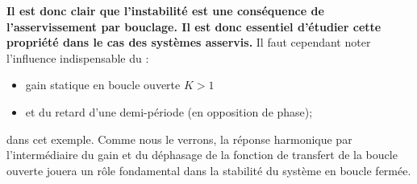 \textbf{Il est donc clair que l'instabilité est une conséquence de 
l'asservissement par bouclage. Il est donc essentiel d'étudier 
cette propriété dans le cas des systèmes asservis.}
Il faut cependant noter l'influence indispensable du :
\begin{itemize}
    \item gain statique en boucle ouverte $K>1$
    \item et du retard d'une demi-période (en opposition de phase); 
\end{itemize}
dans cet exemple. Comme nous le verrons, la réponse harmonique par 
l'intermédiaire du gain et du déphasage de la fonction de transfert 
de la boucle ouverte jouera un rôle fondamental dans la stabilité du système
en boucle fermée.
